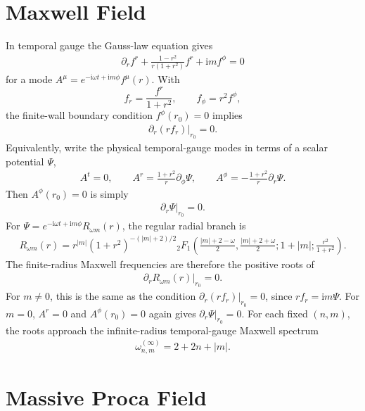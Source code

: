 \documentclass[11pt]{article}
\newcommand{\ii}{\mathrm{i}}
\newcommand{\pd}{\partial}
\begin{document}
\section{Maxwell Field}

In temporal gauge the Gauss-law equation gives
\begin{align}
\pd_r f^r+\frac{1-r^2}{r(1+r^2)}f^r+\ii m f^\phi=0
\end{align}
for a mode \(A^\mu=e^{-\ii\omega t+\ii m\phi}f^\mu(r)\).  With
\[
f_r=\frac{f^r}{1+r^2},\qquad f_\phi=r^2 f^\phi ,
\]
the finite-wall boundary condition \(f^\phi(r_0)=0\) implies
\begin{align}
\pd_r(r f_r)\big|_{r_0}=0 .
\end{align}
Equivalently, write the physical temporal-gauge modes in terms of a scalar
potential \(\Psi\),
\begin{align}
A^t=0,\qquad
A^r=\frac{1+r^2}{r}\pd_\phi\Psi,\qquad
A^\phi=-\frac{1+r^2}{r}\pd_r\Psi .
\end{align}
Then \(A^\phi(r_0)=0\) is simply
\begin{align}
\pd_r\Psi\big|_{r_0}=0 .
\end{align}
For
\(\Psi=e^{-\ii\omega t+\ii m\phi}R_{\omega m}(r)\), the regular radial
branch is
\begin{align}
R_{\omega m}(r)=
r^{|m|}(1+r^2)^{-(|m|+2)/2}
{}_2F_1\!\left(
\frac{|m|+2-\omega}{2},
\frac{|m|+2+\omega}{2};
1+|m|;
\frac{r^2}{1+r^2}
\right).
\end{align}
The finite-radius Maxwell frequencies are therefore the positive roots of
\begin{align}
\pd_rR_{\omega m}(r)\big|_{r_0}=0 .
\end{align}
For \(m\ne0\), this is the same as the condition
\(\pd_r(r f_r)|_{r_0}=0\), since \(r f_r=\ii m\Psi\).  For \(m=0\), \(A^r=0\)
and \(A^\phi(r_0)=0\) again gives \(\pd_r\Psi|_{r_0}=0\).  For each fixed
\((n,m)\), the roots approach the infinite-radius temporal-gauge Maxwell
spectrum
\begin{align}
\omega_{n,m}^{(\infty)}=2+2n+|m| .
\end{align}

\section{Massive Proca Field}
\end{document}

